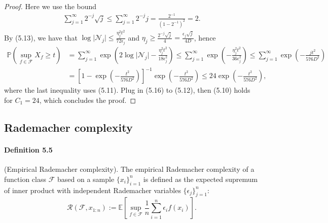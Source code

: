 \documentclass{article}
\newcommand{\E}{\mathbb{E}}
\begin{document}
\begin{proof}
Here we use the bound
\begin{align*}
	\sum_{j=1}^\infty 2^{-j}\sqrt{j} \leq \sum_{j=1}^\infty 2^{-j}j = \frac{2^{-1}}{(1-2^{-1})^2} = 2.\tag{5.15}
\end{align*}
By (5.13), we have that $\log\vert\mathcal{N}_j\vert \leq \frac{\eta_j^2t^2}{72\epsilon_j}$ and $\eta_j\geq\frac{2^{-j}\sqrt{j}}{4} = \frac{\epsilon_{j}\sqrt{j}}{4D}$, hence
\begin{align*}
	\mathbb{P}\left(\sup_{f\in\mathcal{F}} X_f\geq t\right) &= \sum_{j=1}^\infty\exp\left(2\log\vert\mathcal{N}_j\vert - \frac{\eta_j^2t^2}{18\epsilon_{j}^2}\right)
	\leq\sum_{j=1}^\infty\exp\left(- \frac{\eta_j^2t^2}{36\epsilon_{j}^2}\right)
	\leq \sum_{j=1}^\infty\exp\left(-\frac{jt^2}{576D^2}\right)\\
	&= \left[1 - \exp\left(-\frac{t^2}{576D^2}\right)\right]^{-1}\exp\left(-\frac{t^2}{576D^2}\right)\leq 24\exp\left(-\frac{t^2}{576D^2}\right),\tag{5.16}
\end{align*}
where the last inequality uses (5.11). Plug in (5.16) to (5.12), then (5.10) holds for $C_1=24$, which concludes the proof.
\end{proof}

\subsection{Rademacher complexity}
\paragraph{Definition 5.5} (Empirical Rademacher complexity). The empirical Rademacher complexity of a function class $\mathcal{F}$ based on a sample $\{x_i\}_{i=1}^n$ is defined as the expected supremum of inner product with independent Rademacher variables $\{\epsilon_j\}_{j=1}^n$:
\begin{equation*}
	\mathcal{R}(\mathcal{F},x_{1:n}) := \E\left[\sup_{f\in\mathcal{F}}\frac{1}{n}\sum_{i=1}^n\epsilon_i f(x_i)\right].\tag{5.17}
\end{equation*}
\end{document}
